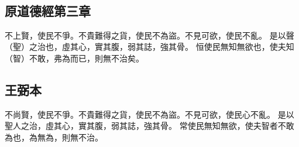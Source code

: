 ﻿%
%

\chapter{~}

\section{原道德經第三章}

\begin{withgezhu}

\zhsong


不上賢，使民不爭。\colorbox{adding-color}{不貴難得之貨，使}民不為\colorbox{adding-color}{盜。不見可欲，使}民不亂。
是以聲（\textcolor{tongjia-color}{聖}）之\colorbox{adding-color}{治也，虛其心，實其腹，弱其誌}，強其骨。
\colorbox{adding-color}{恒}使民無知無欲也，使\colorbox{adding-color}{夫知（\textcolor{tongjia-color}{智}）不敢，弗為而已，則無不治矣}。

\end{withgezhu}

\section{王弼本}

\begin{withgezhu}

\zhsong

不尚賢，使民不爭。不貴難得之貨，使民不為盜。不見可欲，使民心不亂。
是以聖人之治，虛其心，實其腹，弱其誌，強其骨。
常使民無知無欲，使夫智者不敢為也，為無為，則無不治。

\end{withgezhu}
